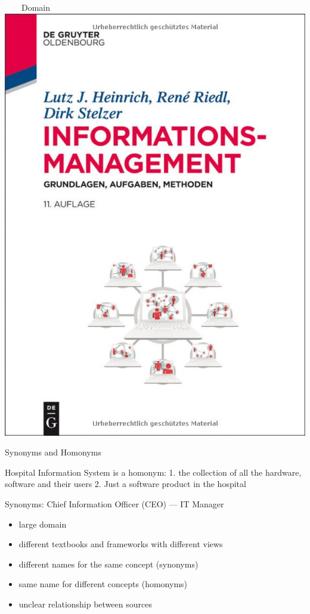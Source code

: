 \documentclass[aspectratio=1610,12pt]{beamer}
\begin{document}
\begin{frame}[plain]{~~~~Domain}
\centering\includegraphics[height=0.77\textheight,keepaspectratio]{img/book-he.jpg}
\end{frame}
\restoregeometry

\begin{frame}{Synonyms and Homonyms}
\end{frame}

\iffalse
Hospital Information System is a homonym:
1. the collection of all the hardware, software and their users 
2. Just a software product in the hospital

Synonyms: Chief Information Officer (CEO) --- IT Manager

\begin{itemize}
\item large domain
\item different textbooks and frameworks with different views
\item different names for the same concept (synonyms)
\item same name for different concepts  (homonyms)
\item unclear relationship between sources
\end{itemize}
\end{document}
